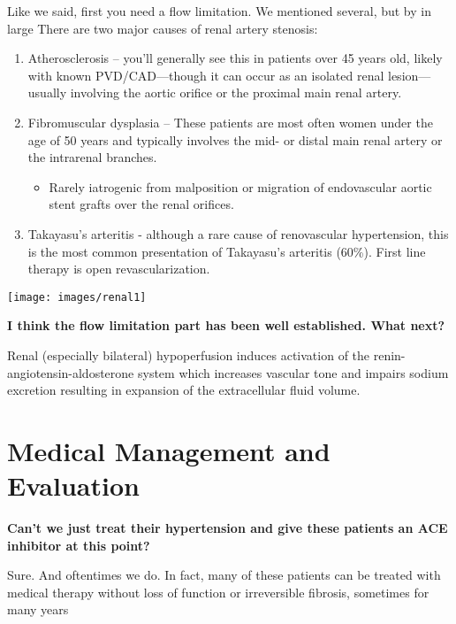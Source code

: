 \documentclass[
]{book}
\providecommand{\tightlist}{%
  \setlength{\itemsep}{0pt}\setlength{\parskip}{0pt}}
\begin{document}
Like we said, first you need a flow limitation. We mentioned several,
but by in large There are two major causes of renal artery stenosis:

\begin{enumerate}
\def\labelenumi{\arabic{enumi}.}
\item
  Atherosclerosis -- you'll generally see this in patients over 45
  years old, likely with known PVD/CAD---though it can occur as an
  isolated renal lesion---usually involving the aortic orifice or the
  proximal main renal artery.
\item
  Fibromuscular dysplasia -- These patients are most often women under
  the age of 50 years and typically involves the mid- or distal main
  renal artery or the intrarenal branches.

  \begin{itemize}
  \tightlist
  \item
    Rarely iatrogenic from malposition or migration of endovascular
    aortic stent grafts over the renal orifices.
  \end{itemize}
\item
  Takayasu's arteritis - although a rare cause of renovascular
  hypertension, this is the most common presentation of Takayasu's
  arteritis (60\%). First line therapy is open revascularization.
  \citep{ehlert139TakayasuDisease2019, weaverRenalRevascularizationTakayasu2004, zhuTakayasuArteritisImaging2012}
\end{enumerate}

\texttt{[image: images/renal1]}

\textbf{I think the flow limitation part has been well established. What
next?}

Renal (especially bilateral) hypoperfusion induces activation of the
renin-angiotensin-aldosterone system which increases vascular tone and
impairs sodium excretion resulting in expansion of the extracellular
fluid volume.

\hypertarget{medical-management-and-evaluation}{%
\section{Medical Management and Evaluation}\label{medical-management-and-evaluation}}

\textbf{Can't we just treat their hypertension and give these patients an ACE
inhibitor at this point?}

Sure. And oftentimes we do. In fact, many of these patients can be
treated with medical therapy without loss of function or irreversible
fibrosis, sometimes for many years
\end{document}

